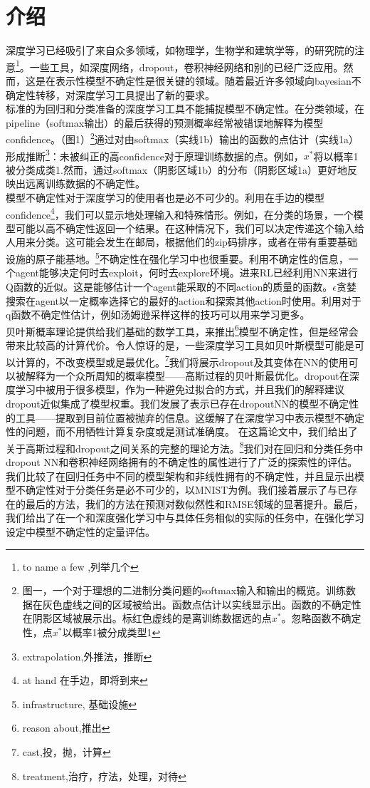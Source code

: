\documentclass[2pt,a4paper]{article}
\begin{document}
\section{介绍}
深度学习已经吸引了来自众多领域，如物理学，生物学和建筑学等，的研究院的注意\footnote{to name a few ,列举几个}。一些工具，如深度网络，dropout，卷积神经网络和别的已经广泛应用。然而，这是在表示性模型不确定性是很关键的领域。随着最近许多领域向bayesian不确定性转移，对深度学习工具提出了新的要求。\\
标准的为回归和分类准备的深度学习工具不能捕捉模型不确定性。在分类领域，在pipeline（softmax输出）的最后获得的预测概率经常被错误地解释为模型confidence。（图1）\footnote{图一，一个对于理想的二进制分类问题的softmax输入和输出的概览。训练数据在灰色虚线之间的区域被给出。函数点估计以实线显示出。函数的不确定性在阴影区域被展示出。标红色虚线的是离训练数据远的点$x^*$。忽略函数不确定性，点$x^*$以概率1被分成类型1}通过对由softmax（实线1b）输出的函数的点估计（实线1a）形成推断\footnote{extrapolation,外推法，推断}：未被纠正的高confidence对于原理训练数据的点。例如，$x^*$将以概率1被分类成类1.然而，通过softmax（阴影区域1b）的分布（阴影区域1a）更好地反映出远离训练数据的不确定性。\\
模型不确定性对于深度学习的使用者也是必不可少的。利用在手边的模型confidence\footnote{at hand 在手边，即将到来}，我们可以显示地处理输入和特殊情形。例如，在分类的场景，一个模型可能以高不确定性返回一个结果。在这种情况下，我们可以决定传递这个输入给人用来分类。这可能会发生在邮局，根据他们的zip码排序，或者在带有重要基础设施的原子能基地。\footnote{infrastructure, 基础设施}不确定性在强化学习中也很重要。利用不确定性的信息，一个agent能够决定何时去exploit，何时去explore环境。进来RL已经利用NN来进行Q函数的近似。这是能够估计一个agent能采取的不同action的质量的函数。$\epsilon$贪婪搜索在agent以一定概率选择它的最好的action和探索其他action时使用。利用对于q函数不确定性估计，例如汤姆逊采样这样的技巧可以用来学习更多。\\
贝叶斯概率理论提供给我们基础的数学工具，来推出\footnote{reason about,推出}模型不确定性，但是经常会带来比较高的计算代价。令人惊讶的是，一些深度学习工具如贝叶斯模型可能是可以计算的，不改变模型或是最优化。\footnote{cast,投，抛，计算}我们将展示dropout及其变体在NN的使用可以被解释为一个众所周知的概率模型——高斯过程的贝叶斯最优化。dropout在深度学习中被用于很多模型，作为一种避免过拟合的方式，并且我们的解释建议dropout近似集成了模型权重。我们发展了表示已存在dropoutNN的模型不确定性的工具——提取到目前位置被抛弃的信息。这缓解了在深度学习中表示模型不确定性的问题，而不用牺牲计算复杂度或是测试准确度。
在这篇论文中，我们给出了关于高斯过程和dropout之间关系的完整的理论方法。\footnote{treatment,治疗，疗法，处理，对待}我们对在回归和分类任务中dropout NN和卷积神经网络拥有的不确定性的属性进行了广泛的探索性的评估。我们比较了在回归任务中不同的模型架构和非线性拥有的不确定性，并且显示出模型不确定性对于分类任务是必不可少的，以MNIST为例。我们接着展示了与已存在的最后的方法，我们的方法在预测对数似然性和RMSE领域的显著提升。最后，我们给出了在一个和深度强化学习中与具体任务相似的实际的任务中，在强化学习设定中模型不确定性的定量评估。
\end{document}
